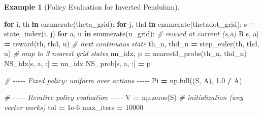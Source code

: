 \documentclass[
]{book}
\newenvironment{Shaded}{\begin{snugshade}}{\end{snugshade}}
\newcommand{\BuiltInTok}[1]{#1}
\newcommand{\CommentTok}[1]{\textcolor[rgb]{0.56,0.35,0.01}{\textit{#1}}}
\newcommand{\ControlFlowTok}[1]{\textcolor[rgb]{0.13,0.29,0.53}{\textbf{#1}}}
\newcommand{\DecValTok}[1]{\textcolor[rgb]{0.00,0.00,0.81}{#1}}
\newcommand{\FloatTok}[1]{\textcolor[rgb]{0.00,0.00,0.81}{#1}}
\newcommand{\KeywordTok}[1]{\textcolor[rgb]{0.13,0.29,0.53}{\textbf{#1}}}
\newcommand{\NormalTok}[1]{#1}
\newcommand{\OperatorTok}[1]{\textcolor[rgb]{0.81,0.36,0.00}{\textbf{#1}}}
\theoremstyle{definition}
\theoremstyle{definition}
\newtheorem{example}{Example}[chapter]
\theoremstyle{definition}
\theoremstyle{definition}
\theoremstyle{remark}
\begin{document}
\begin{example}[Policy Evaluation for Inverted Pendulum]
\begin{Shaded}
\begin{Highlighting}[]
\ControlFlowTok{for}\NormalTok{ i, th }\KeywordTok{in} \BuiltInTok{enumerate}\NormalTok{(theta\_grid):}
    \ControlFlowTok{for}\NormalTok{ j, thd }\KeywordTok{in} \BuiltInTok{enumerate}\NormalTok{(thetadot\_grid):}
\NormalTok{        s }\OperatorTok{=}\NormalTok{ state\_index(i, j)}
        \ControlFlowTok{for}\NormalTok{ a, u }\KeywordTok{in} \BuiltInTok{enumerate}\NormalTok{(u\_grid):}
            \CommentTok{\# reward at current (s,a)}
\NormalTok{            R[s, a] }\OperatorTok{=}\NormalTok{ reward(th, thd, u)}
            \CommentTok{\# next continuous state}
\NormalTok{            th\_n, thd\_n }\OperatorTok{=}\NormalTok{ step\_euler(th, thd, u)}
            \CommentTok{\# map to 3 nearest grid states}
\NormalTok{            nn\_idx, p }\OperatorTok{=}\NormalTok{ nearest3\_probs(th\_n, thd\_n)}
\NormalTok{            NS\_idx[s, a, :] }\OperatorTok{=}\NormalTok{ nn\_idx}
\NormalTok{            NS\_prob[s, a, :] }\OperatorTok{=}\NormalTok{ p}

\CommentTok{\# {-}{-}{-}{-}{-} Fixed policy: uniform over actions {-}{-}{-}{-}{-}}
\NormalTok{Pi }\OperatorTok{=}\NormalTok{ np.full((S, A), }\FloatTok{1.0} \OperatorTok{/}\NormalTok{ A)}

\CommentTok{\# {-}{-}{-}{-}{-} Iterative policy evaluation {-}{-}{-}{-}{-}}
\NormalTok{V }\OperatorTok{=}\NormalTok{ np.zeros(S)  }\CommentTok{\# initialization (any vector works)}
\NormalTok{tol }\OperatorTok{=} \FloatTok{1e{-}6}
\NormalTok{max\_iters }\OperatorTok{=} \DecValTok{10000}


\end{Highlighting}
\end{Shaded}
\end{example}
\end{document}
